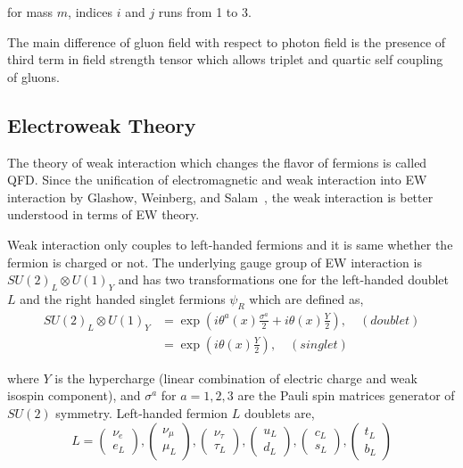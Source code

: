 for mass \( m \), indices \( i \) and \( j \) runs from 1 to 3.

The main difference of gluon field with respect to photon field is
the presence of third term in
field strength tensor which allows triplet and quartic
self coupling of gluons.

\subsection{
  Electroweak Theory
}\label{ch_intro:ew}

The theory of weak interaction which changes the flavor of fermions is
called \gls{QFD}. Since the unification of electromagnetic
and weak interaction into \gls{EW} interaction by
Glashow, Weinberg, and Salam~\cite{Glashow1959,Weinberg1967,Salam1959},
the weak interaction is better understood in terms of \gls{EW} theory.

Weak interaction only couples to left-handed fermions and it is same
whether the fermion is charged or not. The underlying gauge group of
\gls{EW} interaction is \( {SU(2)}_{L} \otimes {U(1)}_{Y} \) and
has two transformations one for the left-handed doublet
\( L \) and the right handed singlet fermions \( \psi_R \) which are defined as,
%
\begin{align}
  {SU(2)}_{L} \otimes {U(1)}_{Y} & =
  \exp \left( {i \theta^{a}(x) \frac{\sigma^a}{2}} + {i \theta(x) \frac{Y}{2}} \right)
  , \quad (doublet)                                                                \\
                                 & = \exp \left( {i \theta(x) \frac{Y}{2}} \right)
  , \quad (singlet)
\end{align}

where \( Y \) is the hypercharge (linear combination of electric charge and weak
isospin component), and \( \sigma^{a} \) for \( a = 1,2,3 \)
are the Pauli spin matrices generator of \( SU(2) \) symmetry. Left-handed
fermion \( L \) doublets are,
%
\begin{equation}
  L = \left(\begin{matrix}
    \nu_e \\
    e_L
  \end{matrix}\right) ,
  \left(\begin{matrix}
    \nu_\mu \\
    \mu_L
  \end{matrix}\right) ,
  \left(\begin{matrix}
    \nu_\tau \\
    \tau_L
  \end{matrix}\right) ,
  \left(\begin{matrix}
    u_L \\
    d_L
  \end{matrix}\right) ,
  \left(\begin{matrix}
    c_L \\
    s_L
  \end{matrix}\right) ,
  \left(\begin{matrix}
    t_L \\
    b_L
  \end{matrix}\right)
\end{equation}

